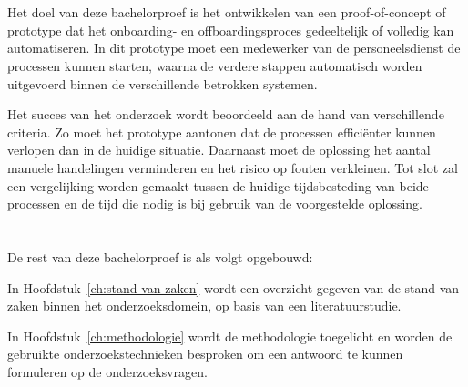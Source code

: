 \section{}%
\label{sec:onderzoeksdoelstelling}


Het doel van deze bachelorproef is het ontwikkelen van een proof-of-concept of prototype dat het onboarding- en offboardingsproces gedeeltelijk of volledig kan automatiseren. In dit prototype moet een medewerker van de personeelsdienst de processen kunnen starten, waarna de verdere stappen automatisch worden uitgevoerd binnen de verschillende betrokken systemen. \newline

Het succes van het onderzoek wordt beoordeeld aan de hand van verschillende criteria. Zo moet het prototype aantonen dat de processen efficiënter kunnen verlopen dan in de huidige situatie. Daarnaast moet de oplossing het aantal manuele handelingen verminderen en het risico op fouten verkleinen. Tot slot zal een vergelijking worden gemaakt tussen de huidige tijdsbesteding van beide processen en de tijd die nodig is bij gebruik van de voorgestelde oplossing.

\section{}%
\label{sec:opzet-bachelorproef}


De rest van deze bachelorproef is als volgt opgebouwd:

In Hoofdstuk~\ref{ch:stand-van-zaken} wordt een overzicht gegeven van de stand van zaken binnen het onderzoeksdomein, op basis van een literatuurstudie.

In Hoofdstuk~\ref{ch:methodologie} wordt de methodologie toegelicht en worden de gebruikte onderzoekstechnieken besproken om een antwoord te kunnen formuleren op de onderzoeksvragen.

